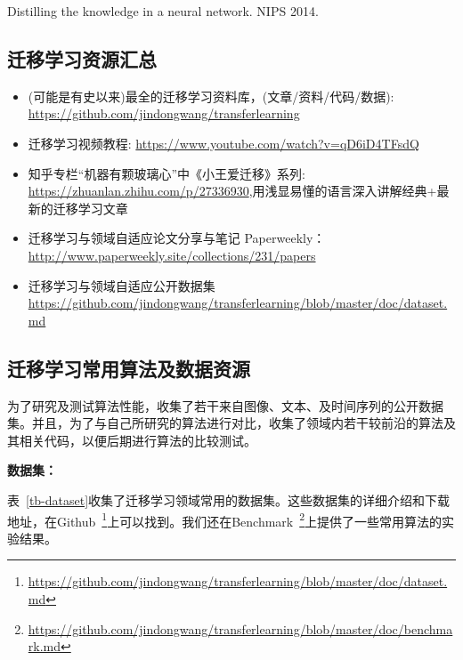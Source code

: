 Distilling the knowledge in a neural network. NIPS 2014.

\subsection{迁移学习资源汇总}

\begin{itemize}
	\item (可能是有史以来)最全的迁移学习资料库，(文章/资料/代码/数据):	\url{https://github.com/jindongwang/transferlearning}
	\item 迁移学习视频教程:	\url{https://www.youtube.com/watch?v=qD6iD4TFsdQ}
	\item 知乎专栏“机器有颗玻璃心”中《小王爱迁移》系列:	\url{https://zhuanlan.zhihu.com/p/27336930},用浅显易懂的语言深入讲解经典+最新的迁移学习文章
	\item 迁移学习与领域自适应论文分享与笔记	Paperweekly：\url{http://www.paperweekly.site/collections/231/papers}
	\item 迁移学习与领域自适应公开数据集
	\url{https://github.com/jindongwang/transferlearning/blob/master/doc/dataset.md}
\end{itemize}

\subsection{迁移学习常用算法及数据资源}
\label{sec-dataset}

为了研究及测试算法性能，收集了若干来自图像、文本、及时间序列的公开数据集。并且，为了与自己所研究的算法进行对比，收集了领域内若干较前沿的算法及其相关代码，以便后期进行算法的比较测试。

\textbf{数据集：}

表~\ref{tb-dataset}收集了迁移学习领域常用的数据集。这些数据集的详细介绍和下载地址，在Github~\footnote{\url{https://github.com/jindongwang/transferlearning/blob/master/doc/dataset.md}}上可以找到。我们还在Benchmark~\footnote{\url{https://github.com/jindongwang/transferlearning/blob/master/doc/benchmark.md}}上提供了一些常用算法的实验结果。

